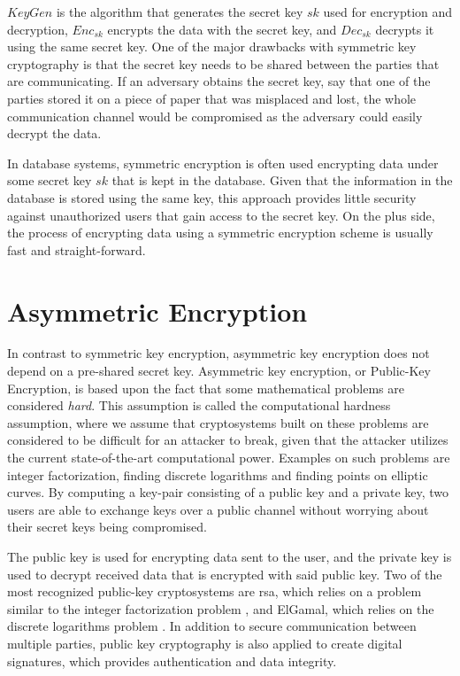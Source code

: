$KeyGen$ is the algorithm that generates the secret key $sk$ used for encryption and decryption, $Enc_{sk}$ encrypts the data with the secret key, and $Dec_{sk}$ decrypts it using the same secret key. One of the major drawbacks with symmetric key cryptography is that the secret key needs to be shared between the parties that are communicating. If an adversary obtains the secret key, say that one of the parties stored it on a piece of paper that was misplaced and lost, the whole communication channel would be compromised as the adversary could easily decrypt the data.

In database systems, symmetric encryption is often used encrypting data under some secret key $sk$ that is kept in the database. Given that the information in the database is stored using the same key, this approach provides little security against unauthorized users that gain access to the secret key. On the plus side, the process of encrypting data using a symmetric encryption scheme is usually fast and straight-forward.


\section{Asymmetric Encryption}
\label{sec:asymmetric}
In contrast to symmetric key encryption, asymmetric key encryption does not depend on a pre-shared secret key. Asymmetric key encryption, or Public-Key Encryption, is based upon the fact that some mathematical problems are considered \emph{hard}. This assumption is called the computational hardness assumption, where we assume that cryptosystems built on these problems are considered to be difficult for an attacker to break, given that the attacker utilizes the current state-of-the-art computational power. Examples on such problems are integer factorization, finding discrete logarithms and finding points on elliptic curves. By computing a key-pair consisting of a public key and a private key, two users are able to exchange keys over a public channel without worrying about their secret keys being compromised.


The public key is used for encrypting data sent to the user, and the private key is used to decrypt received data that is encrypted with said public key. Two of the most recognized public-key cryptosystems are \gls{rsa}, which relies on a problem similar to the integer factorization problem \cite{rivest1978data}, and ElGamal, which relies on the discrete logarithms problem \cite{elgamal}. In addition to secure communication between multiple parties, public key cryptography is also applied to create digital signatures, which provides authentication and data integrity.

